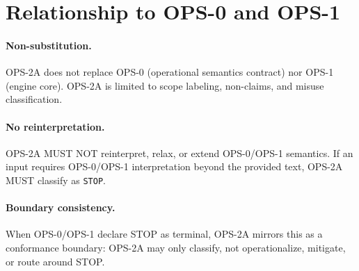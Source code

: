 
\section{Relationship to OPS-0 and OPS-1}

\paragraph{Non-substitution.}
OPS-2A does not replace OPS-0 (operational semantics contract) nor OPS-1 (engine core).
OPS-2A is limited to scope labeling, non-claims, and misuse classification.

\paragraph{No reinterpretation.}
OPS-2A MUST NOT reinterpret, relax, or extend OPS-0/OPS-1 semantics. If an input requires
OPS-0/OPS-1 interpretation beyond the provided text, OPS-2A MUST classify as \texttt{STOP}.

\paragraph{Boundary consistency.}
When OPS-0/OPS-1 declare STOP as terminal, OPS-2A mirrors this as a conformance boundary:
OPS-2A may only classify, not operationalize, mitigate, or route around STOP.
